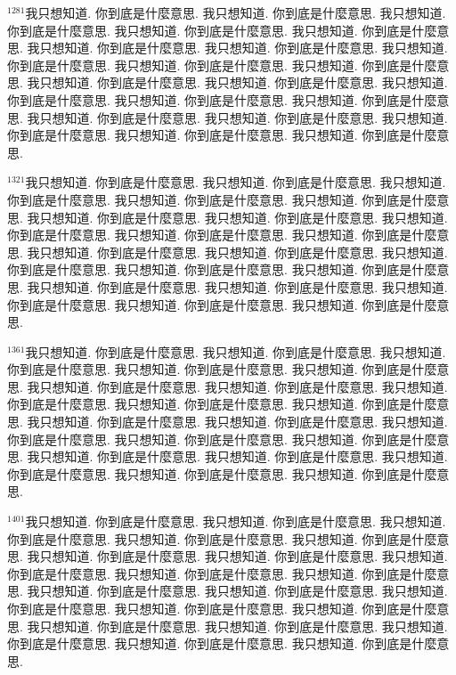 \documentclass{book}
\begin{document}
$^{1281}$我只想知道.
你到底是什麼意思.
我只想知道.
你到底是什麼意思.
我只想知道.
你到底是什麼意思.
我只想知道.
你到底是什麼意思.
我只想知道.
你到底是什麼意思.
我只想知道.
你到底是什麼意思.
我只想知道.
你到底是什麼意思.
我只想知道.
你到底是什麼意思.
我只想知道.
你到底是什麼意思.
我只想知道.
你到底是什麼意思.
我只想知道.
你到底是什麼意思.
我只想知道.
你到底是什麼意思.
我只想知道.
你到底是什麼意思.
我只想知道.
你到底是什麼意思.
我只想知道.
你到底是什麼意思.
我只想知道.
你到底是什麼意思.
我只想知道.
你到底是什麼意思.
我只想知道.
你到底是什麼意思.
我只想知道.
你到底是什麼意思.
我只想知道.
你到底是什麼意思.

$^{1321}$我只想知道.
你到底是什麼意思.
我只想知道.
你到底是什麼意思.
我只想知道.
你到底是什麼意思.
我只想知道.
你到底是什麼意思.
我只想知道.
你到底是什麼意思.
我只想知道.
你到底是什麼意思.
我只想知道.
你到底是什麼意思.
我只想知道.
你到底是什麼意思.
我只想知道.
你到底是什麼意思.
我只想知道.
你到底是什麼意思.
我只想知道.
你到底是什麼意思.
我只想知道.
你到底是什麼意思.
我只想知道.
你到底是什麼意思.
我只想知道.
你到底是什麼意思.
我只想知道.
你到底是什麼意思.
我只想知道.
你到底是什麼意思.
我只想知道.
你到底是什麼意思.
我只想知道.
你到底是什麼意思.
我只想知道.
你到底是什麼意思.
我只想知道.
你到底是什麼意思.

$^{1361}$我只想知道.
你到底是什麼意思.
我只想知道.
你到底是什麼意思.
我只想知道.
你到底是什麼意思.
我只想知道.
你到底是什麼意思.
我只想知道.
你到底是什麼意思.
我只想知道.
你到底是什麼意思.
我只想知道.
你到底是什麼意思.
我只想知道.
你到底是什麼意思.
我只想知道.
你到底是什麼意思.
我只想知道.
你到底是什麼意思.
我只想知道.
你到底是什麼意思.
我只想知道.
你到底是什麼意思.
我只想知道.
你到底是什麼意思.
我只想知道.
你到底是什麼意思.
我只想知道.
你到底是什麼意思.
我只想知道.
你到底是什麼意思.
我只想知道.
你到底是什麼意思.
我只想知道.
你到底是什麼意思.
我只想知道.
你到底是什麼意思.
我只想知道.
你到底是什麼意思.

$^{1401}$我只想知道.
你到底是什麼意思.
我只想知道.
你到底是什麼意思.
我只想知道.
你到底是什麼意思.
我只想知道.
你到底是什麼意思.
我只想知道.
你到底是什麼意思.
我只想知道.
你到底是什麼意思.
我只想知道.
你到底是什麼意思.
我只想知道.
你到底是什麼意思.
我只想知道.
你到底是什麼意思.
我只想知道.
你到底是什麼意思.
我只想知道.
你到底是什麼意思.
我只想知道.
你到底是什麼意思.
我只想知道.
你到底是什麼意思.
我只想知道.
你到底是什麼意思.
我只想知道.
你到底是什麼意思.
我只想知道.
你到底是什麼意思.
我只想知道.
你到底是什麼意思.
我只想知道.
你到底是什麼意思.
我只想知道.
你到底是什麼意思.
我只想知道.
你到底是什麼意思.
\end{document}
